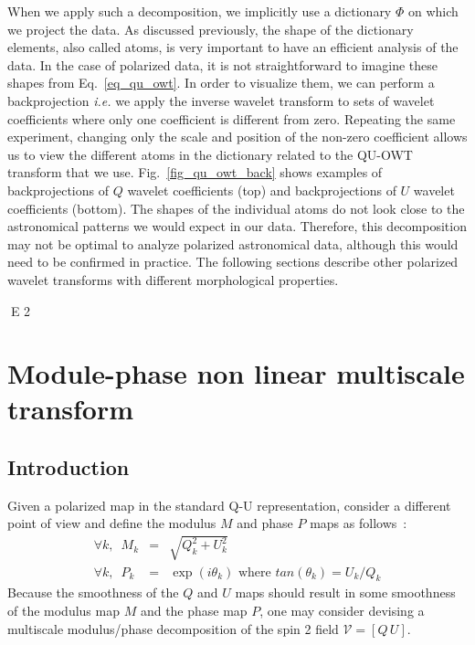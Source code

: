 When we apply such a decomposition, we implicitly use a  dictionary $\Phi$ on which we project the data.
As discussed previously, the shape of the dictionary elements, also called atoms, is very important to have 
an efficient analysis of the data. In the case of polarized data, it is not straightforward to imagine these 
shapes from Eq.~\eqref{eq_qu_owt}. In order to visualize them, we can perform a backprojection \textit{i.e.}
we apply the inverse wavelet transform to sets of wavelet coefficients where only one coefficient is different from zero. 
Repeating the same experiment, changing only the scale and position of the non-zero coefficient allows us 
to view the different atoms in the dictionary related to the  QU-OWT transform that we use. Fig.~\ref{fig_qu_owt_back} shows 
examples of backprojections of $Q$ wavelet coefficients (top) and backprojections of $U$ wavelet coefficients (bottom).
The shapes of the individual atoms do not look close to the astronomical patterns we would expect in our data. 
Therefore, this decomposition may not be optimal to analyze polarized astronomical data, although this would need 
to be confirmed in practice. The following sections describe other polarized wavelet transforms with different morphological properties.

E 2

\section{Module-phase non linear multiscale transform}
\label{sec:modphase}

\subsection{Introduction}
Given a polarized map in the standard Q-U representation, consider a different point of view and define the modulus $M$ and phase $P$ maps as follows~:
%
\begin{eqnarray}
\forall k,\,\,\, M_k & = & \sqrt{Q_k^2 +  U_k^2} \\
\forall k,\,\,\, P_k & = & \exp(i \theta_k) \mbox{ where } tan(\theta_k) = U_k/Q_k 
\end{eqnarray}
Because the smoothness of the $Q$ and $U$ maps should result in some smoothness of the modulus map $M$ and the phase map $P$, 
one may consider devising a multiscale modulus/phase decomposition of the spin 2 field ${\mathcal{V}} = \left[ Q \, U\right]$.\\

